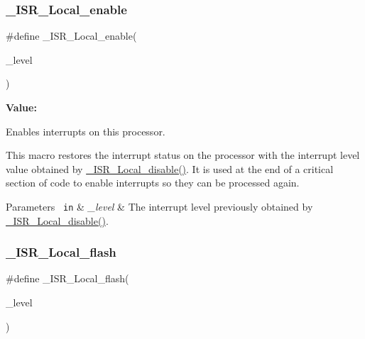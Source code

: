 \subsubsection{\texorpdfstring{\_ISR\_Local\_enable}{\_ISR\_Local\_enable}}
{\footnotesize\ttfamily \#define \+\_\+\+I\+S\+R\+\_\+\+Local\+\_\+enable(\begin{DoxyParamCaption}\item[{}]{\+\_\+level }\end{DoxyParamCaption})}

{\bfseries Value\+:}
\begin{DoxyCode}{0}
\DoxyCodeLine{\textcolor{keywordflow}{do} \{ \(\backslash\)}

\end{DoxyCode}


Enables interrupts on this processor. 

This macro restores the interrupt status on the processor with the interrupt level value obtained by \mbox{\hyperlink{group__RTEMSScoreISR_ga2a829f51f98576aa596562985e1df2fc}{\+\_\+\+I\+S\+R\+\_\+\+Local\+\_\+disable()}}. It is used at the end of a critical section of code to enable interrupts so they can be processed again.


\begin{DoxyParams}[1]{Parameters}
\mbox{\texttt{ in}}  & {\em \+\_\+level} & The interrupt level previously obtained by \mbox{\hyperlink{group__RTEMSScoreISR_ga2a829f51f98576aa596562985e1df2fc}{\+\_\+\+I\+S\+R\+\_\+\+Local\+\_\+disable()}}. \\
\hline
\end{DoxyParams}
\mbox{\label{group__RTEMSScoreISR_ga2ac9dcbae9ca059453a2042e5854f73f}} 
\subsubsection{\texorpdfstring{\_ISR\_Local\_flash}{\_ISR\_Local\_flash}}
{\footnotesize\ttfamily \#define \+\_\+\+I\+S\+R\+\_\+\+Local\+\_\+flash(\begin{DoxyParamCaption}\item[{}]{\+\_\+level }\end{DoxyParamCaption})}

